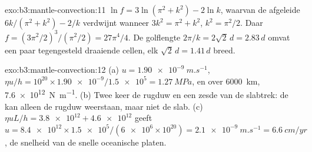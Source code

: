 \begin{solution}{exo:b3:mantle-convection:11}
$\ln f = 3\ln(\pi^2 + k^2) - 2\ln k$, waarvan de afgeleide $6k/(\pi^2 + k^2) - 2/k$
verdwijnt wanneer $3k^2 = \pi^2 + k^2$, $k^2 = \pi^2/2$. Daar $f = (3\pi^2/2)^3/
(\pi^2/2) = 27\pi^4/4$. De golflengte $2\pi/k = 2\sqrt2\,d = 2.83\,d$ omvat een
paar tegengesteld draaiende cellen, elk $\sqrt2\,d = 1.41\,d$ breed.
\end{solution}

\begin{solution}{exo:b3:mantle-convection:12}
(a) $u = \qty{1.90e-9}{m.s^{-1}}$, $\eta u/h = 10^{20}\times\num{1.90e-9}/
\num{1.5e5} = \qty{1.27}{MPa}$, en over \qty{6000}{km}, \qty{7.6e12}{N.m^{-1}}.
(b) Twee keer de rugduw en een zesde van de slabtrek: de  kan
alleen de rugduw weerstaan, maar niet de slab. (c) $\eta uL/h = \num{3.8e12} +
\num{4.6e12}$ geeft $u = \num{8.4e12}\times\num{1.5e5}/(\num{6e6}\times10^{20})
= \qty{2.1e-9}{m.s^{-1}} = \qty{6.6}{cm/yr}$, de snelheid van de snelle oceanische
platen.
\end{solution}


